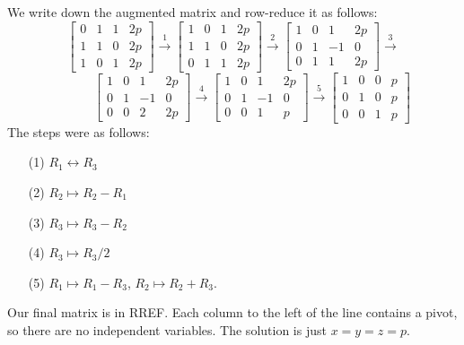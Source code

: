 \documentclass[a4paper]{book}
\newcommand{\xra}       {\xrightarrow}
\renewcommand{\:}{\colon}
\theoremstyle{definition}
\renewenvironment{solution}{\SolutionInline}{\endSolutionInline}
\begin{document}
\begin{solution}
 We write down the augmented matrix and row-reduce it as follows:
 {\small \[
  \left[\begin{array}{ccc|c}
    0 &  1 &  1 & 2p \\
    1 &  1 &  0 & 2p \\
    1 &  0 &  1 & 2p
  \end{array}\right]
  \xra{1}
  \left[\begin{array}{ccc|c}
    1 &  0 &  1 & 2p \\
    1 &  1 &  0 & 2p \\
    0 &  1 &  1 & 2p 
  \end{array}\right]
  \xra{2}
  \left[\begin{array}{ccc|c}
    1 &  0 &  1 & 2p \\
    0 &  1 & -1 & 0  \\
    0 &  1 &  1 & 2p 
  \end{array}\right]
  \xra{3}
  \] \[ \hspace{3em}
  \left[\begin{array}{ccc|c}
    1 &  0 &  1 & 2p \\
    0 &  1 & -1 & 0  \\
    0 &  0 &  2 & 2p 
  \end{array}\right]
  \xra{4}
  \left[\begin{array}{ccc|c}
    1 &  0 &  1 & 2p \\
    0 &  1 & -1 & 0  \\
    0 &  0 &  1 & p 
  \end{array}\right]
  \xra{5}
  \left[\begin{array}{ccc|c}
    1 &  0 &  0 & p \\
    0 &  1 &  0 & p \\
    0 &  0 &  1 & p 
  \end{array}\right]
 \]}
 The steps were as follows:
 \begin{itemize}
  \item[(1)] $R_1\leftrightarrow R_3$
  \item[(2)] $R_2\mapsto R_2-R_1$
  \item[(3)] $R_3\mapsto R_3-R_2$
  \item[(4)] $R_3\mapsto R_3/2$
  \item[(5)] $R_1\mapsto R_1-R_3$, $R_2\mapsto R_2+R_3$.
 \end{itemize}
 Our final matrix is in RREF.  Each column to the left of the line
 contains a pivot, so there are no independent variables.  The
 solution is just $x=y=z=p$.
\end{solution}
\end{document}
